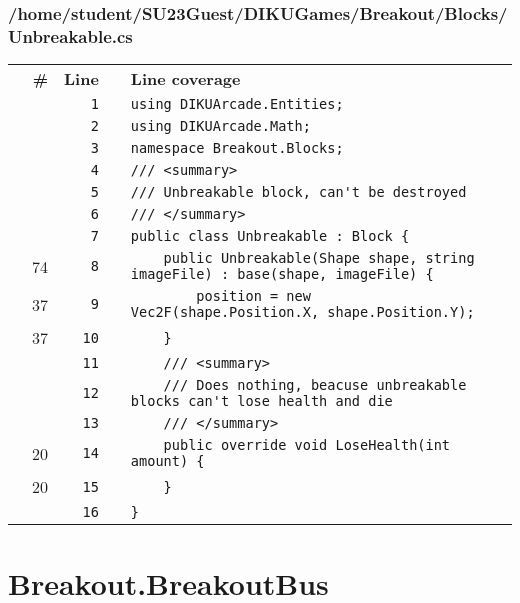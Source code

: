 \documentclass[a4paper,landscape,10pt]{article}
\begin{document}
\subsubsection{/home/student/SU23Guest/DIKUGames/Breakout/Blocks/Unbreakable.cs}
\begin{longtable}[l]{lrrll}
\textbf{} & \textbf{\#} & \textbf{Line} & \textbf{} & \textbf{Line coverage}\\
\cellcolor{gray} &  & \verb~1~ & & \verb~using DIKUArcade.Entities;~\\
\cellcolor{gray} &  & \verb~2~ & & \verb~using DIKUArcade.Math;~\\
\cellcolor{gray} &  & \verb~3~ & & \verb~namespace Breakout.Blocks;~\\
\cellcolor{gray} &  & \verb~4~ & & \verb~/// <summary>~\\
\cellcolor{gray} &  & \verb~5~ & & \verb~/// Unbreakable block, can't be destroyed~\\
\cellcolor{gray} &  & \verb~6~ & & \verb~/// </summary>~\\
\cellcolor{gray} &  & \verb~7~ & & \verb~public class Unbreakable : Block {~\\
\cellcolor{green} & 74 & \verb~8~ & & \verb~    public Unbreakable(Shape shape, string imageFile) : base(shape, imageFile) {~\\
\cellcolor{green} & 37 & \verb~9~ & & \verb~        position = new Vec2F(shape.Position.X, shape.Position.Y);~\\
\cellcolor{green} & 37 & \verb~10~ & & \verb~    }~\\
\cellcolor{gray} &  & \verb~11~ & & \verb~    /// <summary>~\\
\cellcolor{gray} &  & \verb~12~ & & \verb~    /// Does nothing, beacuse unbreakable blocks can't lose health and die~\\
\cellcolor{gray} &  & \verb~13~ & & \verb~    /// </summary>~\\
\cellcolor{green} & 20 & \verb~14~ & & \verb~    public override void LoseHealth(int amount) {~\\
\cellcolor{green} & 20 & \verb~15~ & & \verb~    }~\\
\cellcolor{gray} &  & \verb~16~ & & \verb~}~\\
\end{longtable}
\newpage
\section{Breakout.BreakoutBus}
\end{document}
